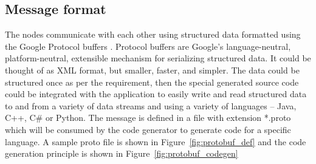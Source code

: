 \subsection{Message format}
The nodes communicate with each other using structured data formatted using the Google Protocol buffers \cite{ProtocolBuffers}. Protocol buffers are Google's language-neutral, platform-neutral, extensible mechanism for serializing structured data. It could be thought of as XML format, but smaller, faster, and simpler. The data could be structured once as per the requirement, then the special generated source code could be integrated with the application to easily write and read structured data to and from a variety of data streams and using a variety of languages – Java, C++, C\# or Python. The message is defined in a file with extension *.proto which will be consumed by the code generator to generate code for a specific language. A sample proto file is shown in Figure~\ref{fig:protobuf_def} and the code generation principle is shown in Figure~\ref{fig:protobuf_codegen}
